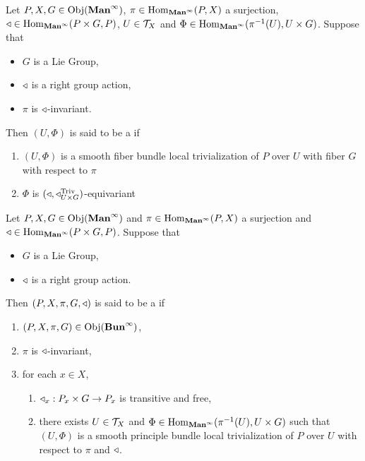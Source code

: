 \documentclass{book}
\begin{document}
\begin{defn}
	Let $P, X, G \in \operatorname{Obj}(\operatorname*{\text{\textbf{Man}}^{\infty}})$, $\pi \in \operatorname{Hom}_{\operatorname*{\text{\textbf{Man}}^{\infty}}}(P, X)$ a surjection, $\triangleleft \in \operatorname{Hom}_{\operatorname*{\text{\textbf{Man}}^{\infty}}}(P \times G , P)$, $U \in \mathcal{T}_X$ and $\Phi \in \operatorname{Hom}_{\operatorname*{\text{\textbf{Man}}^{\infty}}}(\pi^{-1}(U), U \times G)$. Suppose that  
	\begin{itemize}
		\item $G$ is a Lie Group, 
		\item $\triangleleft$ is a right group action,
		\item $\pi$ is $\triangleleft$-invariant.
	\end{itemize}
	Then $(U, \Phi)$ is said to be a  if 
	\begin{enumerate}
		\item $(U, \Phi)$ is a smooth fiber bundle local trivialization of $P$ over $U$ with fiber $G$ with respect to $\pi$
		\item $\Phi$ is $(\triangleleft, \triangleleft^{\text{Triv}}_{U \times G})$-equivariant
	\end{enumerate}
\end{defn}

\begin{defn} \ld{}
	Let $P,X, G \in \operatorname{Obj}(\operatorname*{\text{\textbf{Man}}^{\infty}})$ and $\pi \in \operatorname{Hom}_{\operatorname*{\text{\textbf{Man}}^{\infty}}}(P, X)$ a surjection and $\triangleleft \in \operatorname{Hom}_{\operatorname*{\text{\textbf{Man}}^{\infty}}}(P \times G , P)$. Suppose that 
	\begin{itemize}
		\item $G$ is a Lie Group,
		\item $\triangleleft$ is a right group action.
	\end{itemize}
	Then $(P, X, \pi, G, \triangleleft)$ is said to be a  if 
	\begin{enumerate}
		\item $(P, X, \pi, G) \in \operatorname{Obj}(\operatorname*{\text{\textbf{Bun}}^{\infty}})$, 
		\item $\pi$ is $\triangleleft$-invariant,
		\item for each $x \in X$,
		\begin{enumerate}
			\item  $\triangleleft_x: P_x \times G \rightarrow P_x$ is transitive and free,
			\item  there exists $U \in \mathcal{T}_X$ and $\Phi \in \operatorname{Hom}_{\operatorname*{\text{\textbf{Man}}^{\infty}}}(\pi^{-1}(U), U \times G)$ such that $(U, \Phi)$ is a smooth principle bundle local trivialization of $P$ over $U$ with respect to $\pi$ and $\triangleleft$.
		\end{enumerate}
	\end{enumerate}
\end{defn}
\end{document}
